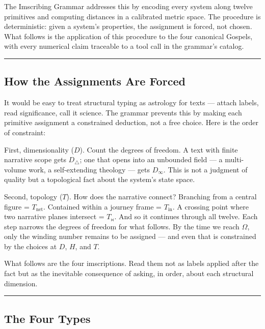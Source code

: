 \documentclass[12pt,a4paper]{article}
\begin{document}
The Imscribing Grammar addresses this by encoding every system along twelve primitives and computing distances in a calibrated metric space. The procedure is deterministic: given a system's properties, the assignment is forced, not chosen. What follows is the application of this procedure to the four canonical Gospels, with every numerical claim traceable to a tool call in the grammar's catalog.

\begin{center}
\rule{0.5\textwidth}{0.4pt}
\end{center}

\subsection{How the Assignments Are Forced}

It would be easy to treat structural typing as astrology for texts --- attach labels, read significance, call it science. The grammar prevents this by making each primitive assignment a constrained deduction, not a free choice. Here is the order of constraint:

First, dimensionality ($D$). Count the degrees of freedom. A text with finite narrative scope gets $D_{\triangle}$; one that opens into an unbounded field --- a multi-volume work, a self-extending theology --- gets $D_{\infty}$. This is not a judgment of quality but a topological fact about the system's state space.

Second, topology ($T$). How does the narrative connect? Branching from a central figure = $T_\text{net}$. Contained within a journey frame = $T_\text{in}$. A crossing point where two narrative planes intersect = $T_{\bowtie}$.
And so it continues through all twelve. Each step narrows the degrees of freedom for what follows. By the time we reach $\Omega$, only the winding number remains to be assigned --- and even that is constrained by the choices at $D$, $H$, and $T$.

What follows are the four imscriptions. Read them not as labels applied after the fact but as the inevitable consequence of asking, in order, about each structural dimension.

\begin{center}
\rule{0.5\textwidth}{0.4pt}
\end{center}

\subsection{The Four Types}
\end{document}
